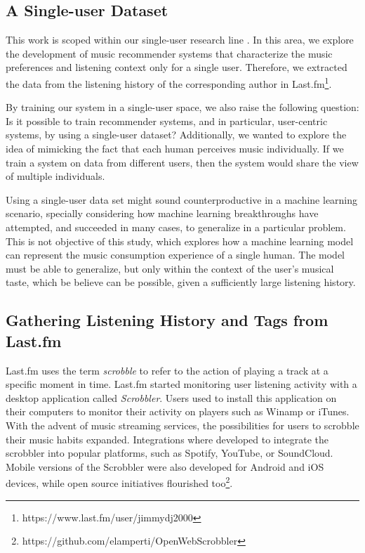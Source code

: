\documentclass[sn-mathphys]{sn-jnl}%
\theoremstyle{thmstyleone}%
\theoremstyle{thmstyletwo}%
\theoremstyle{thmstylethree}%
\begin{document}
\subsection{A Single-user Dataset}

This work is scoped within our single-user research line \cite{ramirez2022user}.
In this area, we explore the development of music recommender systems that
characterize the music preferences and listening context only for a single user.
Therefore, we extracted the data from the
listening history of the corresponding author in Last.fm\footnote[5]{https://www.last.fm/user/jimmydj2000}.

By training our system in a single-user space, we also raise the following question: Is it possible to train
recommender systems, and in particular, user-centric systems, by using a single-user dataset?
Additionally, we wanted to explore the idea of mimicking the fact that each human perceives music individually.
If we train a system on data from different users, then the system would share the view of multiple individuals.

Using a single-user data set might sound counterproductive in a machine learning scenario, specially considering
how machine learning breakthroughs have attempted, and succeeded in many cases, to generalize in a particular problem.
This is not objective of this study, which explores how a machine learning model can represent the music consumption experience of a single human.
The model must be able to generalize, but only within the context of the user's musical taste, which be believe can be possible, given a sufficiently large listening history.


\subsection{Gathering Listening History and Tags from Last.fm}

Last.fm uses the term \emph{scrobble} to refer to the action of playing a track at a specific moment in time.
Last.fm started monitoring user listening activity with a desktop application called \emph{Scrobbler}.
Users used to install this application on their computers to monitor their activity on players such as Winamp or iTunes.
With the advent of music streaming services, the possibilities for users to scrobble their music habits expanded.
Integrations where developed to integrate the scrobbler into popular platforms,
such as Spotify, YouTube, or SoundCloud.
Mobile versions of the Scrobbler were also developed for Android and iOS devices, while open source initiatives flourished too\footnote[6]{https://github.com/elamperti/OpenWebScrobbler}.
\end{document}
